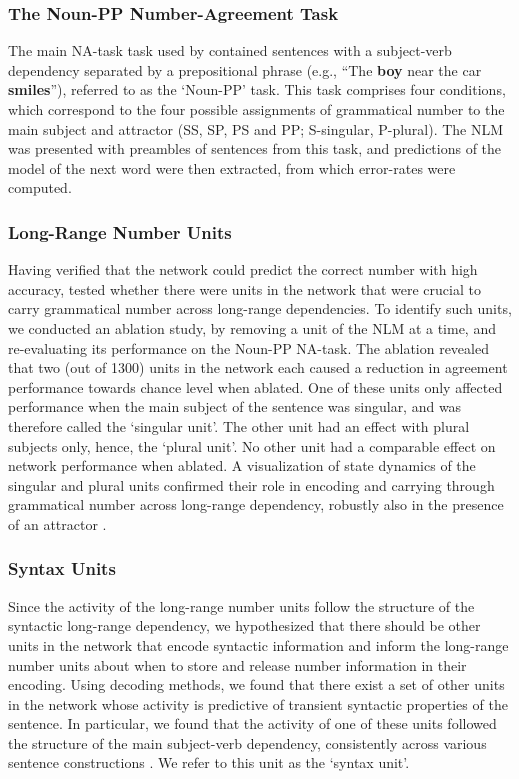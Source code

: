 \subsubsection{The Noun-PP Number-Agreement Task}
The main NA-task task used by \citet{lakretz2019emergence} contained sentences with a subject-verb dependency separated by a prepositional phrase (e.g., ``The \textbf{boy} near the car \textbf{smiles}''), referred to as the `Noun-PP' task. This task comprises four conditions, which correspond to the four possible assignments of grammatical number to the main subject and attractor (SS, SP, PS and PP; S-singular, P-plural). The NLM was presented with preambles of sentences from this task, and predictions of the model of the next word were then extracted, from which error-rates were computed. 

\subsubsection{Long-Range Number Units}
Having verified that the network could predict the correct number with high accuracy, \citet{lakretz2019emergence} tested whether there were units in the network that were crucial to carry grammatical number across long-range dependencies.  To identify such units, we conducted an ablation study, by removing a unit of the NLM at a time, and re-evaluating its performance on the Noun-PP NA-task.  The ablation revealed that two (out of 1300) units in the network each caused a reduction in agreement performance towards chance level when ablated. One of these units only affected performance when the main subject of the sentence was singular, and was therefore called the `singular unit'. The other unit had an effect with plural subjects only, hence, the `plural unit'. 
No other unit had a comparable effect on network performance when ablated. A visualization of state dynamics of the singular and plural units confirmed their role in encoding and carrying through grammatical number across long-range dependency, robustly also in the presence of an attractor \citep[figure 1 in][]{lakretz2019emergence}.

\subsubsection{Syntax Units}
Since the activity of the long-range number units follow the structure of the syntactic long-range dependency, we hypothesized that there should be other units in the network that encode syntactic information and inform the long-range number units about when to store and release number information in their encoding.  Using decoding methods, we found that there exist a set of other units in the network whose activity is predictive of transient syntactic properties of the sentence. 
In particular, we found that the activity of one of these units followed the structure of the main subject-verb dependency, consistently across various sentence constructions \citep[figure 3 in][]{lakretz2019emergence}. 
We refer to this unit as the `syntax unit'.

